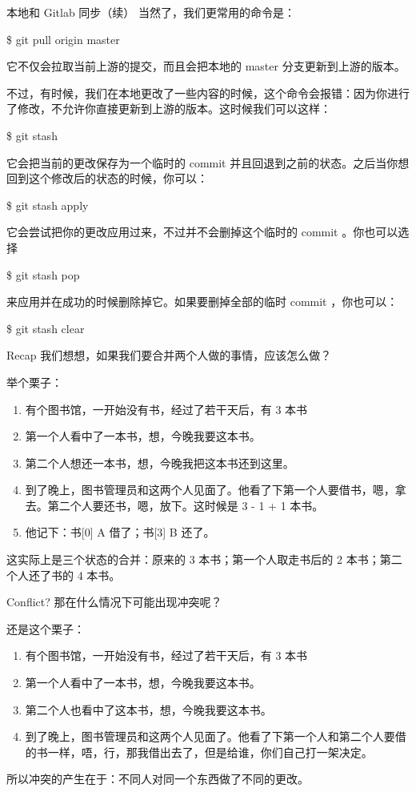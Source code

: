 \documentclass{beamer}
\begin{document}
\begin{frame}{本地和 Gitlab 同步（续）}
    当然了，我们更常用的命令是：

    \$ git pull origin master

    它不仅会拉取当前上游的提交，而且会把本地的 master 分支更新到上游的版本。

    不过，有时候，我们在本地更改了一些内容的时候，这个命令会报错：因为你进行了修改，不允许你直接更新到上游的版本。这时候我们可以这样：

    \$ git stash

    它会把当前的更改保存为一个临时的 commit 并且回退到之前的状态。之后当你想回到这个修改后的状态的时候，你可以：

    \$ git stash apply

    它会尝试把你的更改应用过来，不过并不会删掉这个临时的 commit 。你也可以选择
    
    \$ git stash pop

    来应用并在成功的时候删除掉它。如果要删掉全部的临时 commit ，你也可以：

    \$ git stash clear
\end{frame}

\begin{frame}{Recap}
    我们想想，如果我们要合并两个人做的事情，应该怎么做？

    举个栗子：

    \begin{enumerate}
        \item 有个图书馆，一开始没有书，经过了若干天后，有 3 本书
        \item 第一个人看中了一本书，想，今晚我要这本书。
        \item 第二个人想还一本书，想，今晚我把这本书还到这里。
        \item 到了晚上，图书管理员和这两个人见面了。他看了下第一个人要借书，嗯，拿去。第二个人要还书，嗯，放下。这时候是 3 - 1 + 1 本书。
        \item 他记下：书[0] A 借了；书[3] B 还了。
    \end{enumerate}

    这实际上是三个状态的合并：原来的 3 本书；第一个人取走书后的 2 本书；第二个人还了书的 4 本书。
\end{frame}

\begin{frame}{Conflict?}
    那在什么情况下可能出现冲突呢？

    还是这个栗子：

    \begin{enumerate}
        \item 有个图书馆，一开始没有书，经过了若干天后，有 3 本书
        \item 第一个人看中了一本书，想，今晚我要这本书。
        \item 第二个人也看中了这本书，想，今晚我要这本书。
        \item 到了晚上，图书管理员和这两个人见面了。他看了下第一个人和第二个人要借的书一样，唔，行，那我借出去了，但是给谁，你们自己打一架决定。
    \end{enumerate}

    所以冲突的产生在于：不同人对同一个东西做了不同的更改。
\end{frame}
\end{document}
